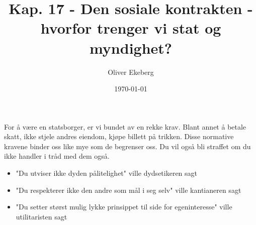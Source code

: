 \documentclass[11pt, a4paper]{article}
\title{Kap. 17 - Den sosiale kontrakten - hvorfor trenger vi stat og myndighet?}
\author{Oliver Ekeberg}
\date{\today}
\begin{document}
\maketitle

\tableofcontents

For å være en statsborger, er vi bundet av en rekke krav. Blant annet å betale skatt, ikke stjele andres eiendom, kjøpe billett på trikken. Disse normative kravene binder oss like mye som de begrenser oss. Du vil også bli straffet om du ikke handler i tråd med dem også.
\begin{itemize}
    \item "Du utviser ikke dyden pålitelighet" ville dydsetikeren sagt
    \item "Du respekterer ikke den andre som mål i seg selv" ville kantianeren sagt
    \item "Du setter størst mulig lykke prinsippet til side for egeninteresse" ville utilitaristen sagt
\end{itemize}
\end{document}
